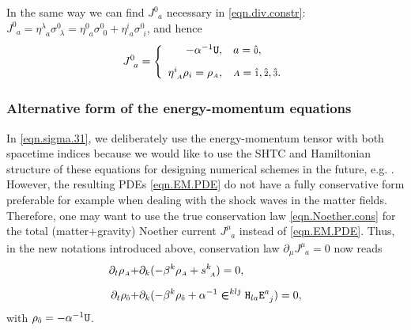 \documentclass[
10pt, %
a4paper, %
oneside, %
headinclude,footinclude, %
BCOR5mm, %
]{scrartcl}
\newcommand{\sA}{\mathsmaller A}
\newcommand{\pd}[1]{\partial_{#1}}
\newcommand{\itetrsymbol}{\eta}
\newcommand{\itetr}[2]{\itetrsymbol^{#1}_{\phantom{#1}#2}}
\newcommand{\stress}[2]{s_{\ #1}^{#2}}
\newcommand{\Hfin}[2]{\mathtt{H}_{#2#1}}	%
\newcommand{\Efin}[2]{\mathtt{E}^{#1}_{\phantom{#1}#2}}	%
\newcommand{\Ufin}{\mathtt{U}}
\newcommand{\EMmat}[2]{\sigma^{#1}_{\ \,#2}}
\newcommand{\LCsymb}{\bm{\in}}    %
\newcommand{\NC}[2]{J^{#2}_{\phantom{#2}#1}}
\newcommand{\indalg}[1]{\hat{\mathsmaller{#1}}}
\newcommand{\shift}[1]{\beta^{#1}}
\begin{document}
In the same way we can find $ \NC{a}{0} $ necessary in \eqref{eqn.div.constr}: $ \NC{a}{0} = 
\itetr{\lambda}{a} \EMmat{0}{\lambda} = \itetr{0}{a} \EMmat{0}{0} + \itetr{i}{a} \EMmat{0}{i}$, and 
hence
\begin{equation}\label{eqn.Ja0}
	\NC{a}{0} = \left\{
	\begin{array}{rl}
		-\alpha^{-1} \Ufin,	& a=\indalg{0},  \\[3mm] 
		\itetr{i}{\sA} \rho_i = \rho_{\sA}, & \sA=\indalg{1},\indalg{2},\indalg{3}. \\ 
	\end{array} 
	\right.
\end{equation}


\subsubsection{Alternative form of the energy-momentum equations}

In \eqref{eqn.sigma.31}, we deliberately use the energy-momentum tensor with both spacetime 
indices because we would like to use the SHTC and Hamiltonian structure \cite{SHTC-GENERIC-CMAT} of 
these equations for designing numerical schemes in the future, e.g. \cite{HTC2022,SPH_SHTC}. 
However, the resulting PDEs 
\eqref{eqn.EM.PDE} do not have a fully 
conservative form preferable for example when dealing with the shock waves in the matter fields.
Therefore, one may want to use the true conservation law \eqref{eqn.Noether.cons} for the total 
(matter+gravity) Noether 
current $ \NC{a}{\mu} $ instead of \eqref{eqn.EM.PDE}. Thus, in the new 
notations introduced above, conservation law $ \pd{\mu}\NC{a}{\mu} = 0 
$ now reads
\begin{subequations}
	\begin{align}
		\pd{t} \rho_\sA + & \pd{k} (-\shift{k} \rho_\sA + \stress{\sA}{k}) = 0,\\[2mm]
		\pd{t} \rho_{\indalg{0}} + & \pd{k} (-\shift{k} \rho_{\indalg{0}} + \alpha^{-1} 
		\LCsymb^{klj}\Hfin{a}{l}\Efin{a}{j}) = 0,
	\end{align}
\end{subequations}
with $ \rho_{\indalg{0}} = -\alpha^{-1} \Ufin $. 
\end{document}
